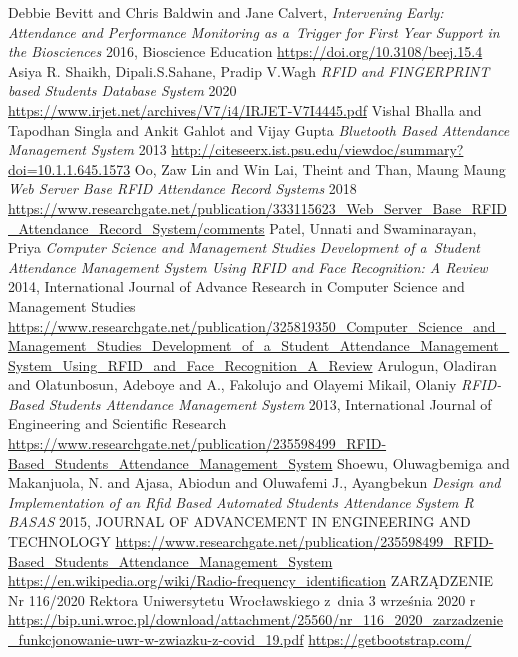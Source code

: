 \documentclass[declaration,shortabstract, mgr]{iithesis}
\begin{document}
\begin{thebibliography}{9}
		Debbie Bevitt and Chris Baldwin and Jane Calvert,
		\textit{Intervening Early: Attendance and Performance Monitoring as a~Trigger for First Year Support in the Biosciences}
		2016, Bioscience Education
		\url{https://doi.org/10.3108/beej.15.4}
		Asiya R. Shaikh, Dipali.S.Sahane, Pradip V.Wagh
		\textit{RFID and FINGERPRINT based Students Database System}
		2020
		\url{https://www.irjet.net/archives/V7/i4/IRJET-V7I4445.pdf}
		Vishal Bhalla and Tapodhan Singla and Ankit Gahlot and Vijay Gupta
		\textit{Bluetooth Based Attendance Management System}
		2013
		\url{http://citeseerx.ist.psu.edu/viewdoc/summary?doi=10.1.1.645.1573}
		Oo, Zaw Lin and Win Lai, Theint and Than, Maung Maung
		\textit{Web Server Base RFID Attendance Record Systems}
		2018
		\url{https://www.researchgate.net/publication/333115623_Web_Server_Base_RFID_Attendance_Record_System/comments}
		Patel, Unnati and Swaminarayan, Priya
		\textit{Computer Science and Management Studies Development of a~Student Attendance Management System Using RFID and Face Recognition: A Review}
		2014, International Journal of Advance Research in Computer Science and Management Studies
		\url{https://www.researchgate.net/publication/325819350_Computer_Science_and_Management_Studies_Development_of_a_Student_Attendance_Management_System_Using_RFID_and_Face_Recognition_A_Review}
		Arulogun, Oladiran and Olatunbosun, Adeboye and A., Fakolujo and Olayemi Mikail, Olaniy
		\textit{RFID-Based Students Attendance Management System}
		2013, International Journal of Engineering and Scientific Research
		\url{https://www.researchgate.net/publication/235598499_RFID-Based_Students_Attendance_Management_System}
		Shoewu, Oluwagbemiga and Makanjuola, N. and Ajasa, Abiodun and Oluwafemi J., Ayangbekun
		\textit{Design and Implementation of an Rfid Based Automated Students Attendance System R BASAS}
		2015, JOURNAL OF ADVANCEMENT IN ENGINEERING AND TECHNOLOGY
		\url{https://www.researchgate.net/publication/235598499_RFID-Based_Students_Attendance_Management_System}
		\url{https://en.wikipedia.org/wiki/Radio-frequency_identification}	
		ZARZĄDZENIE Nr 116/2020 Rektora Uniwersytetu Wrocławskiego z~dnia 3 września 2020 r
		\url{https://bip.uni.wroc.pl/download/attachment/25560/nr_116_2020_zarzadzenie_funkcjonowanie-uwr-w-zwiazku-z-covid_19.pdf}
		\url{https://getbootstrap.com/}	

\end{thebibliography}
\end{document}
